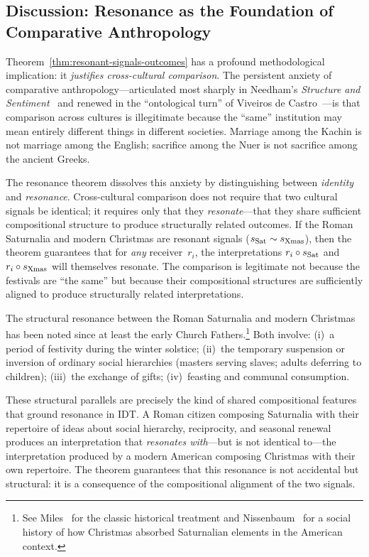 \subsection*{Discussion: Resonance as the Foundation of Comparative Anthropology}

Theorem~\ref{thm:resonant-signals-outcomes} has a profound methodological
implication: it \emph{justifies cross-cultural comparison}.  The
persistent anxiety of comparative anthropology---articulated most sharply
in Needham's \emph{Structure and Sentiment}~\cite{needham1962} and
renewed in the ``ontological turn'' of Viveiros de
Castro~\cite{viveirosdecastro2004}---is that comparison across cultures
is illegitimate because the ``same'' institution may mean entirely
different things in different societies.  Marriage among the Kachin is
not marriage among the English; sacrifice among the Nuer is not sacrifice
among the ancient Greeks.

The resonance theorem dissolves this anxiety by distinguishing between
\emph{identity} and \emph{resonance}.  Cross-cultural comparison does
not require that two cultural signals be identical; it requires only that
they \emph{resonate}---that they share sufficient compositional structure
to produce structurally related outcomes.  If the Roman Saturnalia and
modern Christmas are resonant signals ($s_{\text{Sat}} \sim
s_{\text{Xmas}}$), then the theorem guarantees that for \emph{any}
receiver~$r_i$, the interpretations $r_i \circ s_{\text{Sat}}$ and
$r_i \circ s_{\text{Xmas}}$ will themselves resonate.  The comparison
is legitimate not because the festivals are ``the same'' but because
their compositional structures are sufficiently aligned to produce
structurally related interpretations.

\begin{example}
\label{ex:christmas-saturnalia}
The structural resonance between the Roman Saturnalia and modern
Christmas has been noted since at least the early Church
Fathers.\footnote{See Miles~\cite{miles1912} for the classic historical
treatment and Nissenbaum~\cite{nissenbaum1996} for a social history of
how Christmas absorbed Saturnalian elements in the American context.}
Both involve: (i)~a period of festivity during the winter solstice;
(ii)~the temporary suspension or inversion of ordinary social
hierarchies (masters serving slaves; adults deferring to children);
(iii)~the exchange of gifts; (iv)~feasting and communal consumption.

These structural parallels are precisely the kind of shared compositional
features that ground resonance in IDT\@.  A Roman citizen composing
Saturnalia with their repertoire of ideas about social hierarchy,
reciprocity, and seasonal renewal produces an interpretation that
\emph{resonates with}---but is not identical to---the interpretation
produced by a modern American composing Christmas with their own
repertoire.  The theorem guarantees that this resonance is not
accidental but structural: it is a consequence of the compositional
alignment of the two signals.
\end{example}

